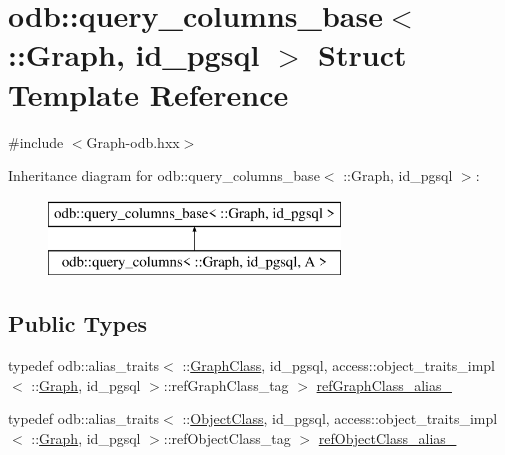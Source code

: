 \hypertarget{structodb_1_1query__columns__base_3_01_1_1_graph_00_01id__pgsql_01_4}{}\section{odb\+:\+:query\+\_\+columns\+\_\+base$<$ \+:\+:Graph, id\+\_\+pgsql $>$ Struct Template Reference}
\label{structodb_1_1query__columns__base_3_01_1_1_graph_00_01id__pgsql_01_4}


{\ttfamily \#include $<$Graph-\/odb.\+hxx$>$}

Inheritance diagram for odb\+:\+:query\+\_\+columns\+\_\+base$<$ \+:\+:Graph, id\+\_\+pgsql $>$\+:\begin{figure}[H]
\begin{center}
\leavevmode
\includegraphics[height=2.000000cm]{dc/df6/structodb_1_1query__columns__base_3_01_1_1_graph_00_01id__pgsql_01_4}
\end{center}
\end{figure}
\subsection*{Public Types}
\begin{DoxyCompactItemize}
\item 
typedef odb\+::alias\+\_\+traits$<$ \+::\hyperlink{class_graph_class}{Graph\+Class}, id\+\_\+pgsql, access\+::object\+\_\+traits\+\_\+impl$<$ \+::\hyperlink{class_graph}{Graph}, id\+\_\+pgsql $>$\+::ref\+Graph\+Class\+\_\+tag $>$ \hyperlink{structodb_1_1query__columns__base_3_01_1_1_graph_00_01id__pgsql_01_4_a4306d56e8c22637d01aec76fb2662416}{ref\+Graph\+Class\+\_\+alias\+\_\+}
\item 
typedef odb\+::alias\+\_\+traits$<$ \+::\hyperlink{class_object_class}{Object\+Class}, id\+\_\+pgsql, access\+::object\+\_\+traits\+\_\+impl$<$ \+::\hyperlink{class_graph}{Graph}, id\+\_\+pgsql $>$\+::ref\+Object\+Class\+\_\+tag $>$ \hyperlink{structodb_1_1query__columns__base_3_01_1_1_graph_00_01id__pgsql_01_4_ab9ee301664ba12da094e2866ff789e53}{ref\+Object\+Class\+\_\+alias\+\_\+}
\end{DoxyCompactItemize}


